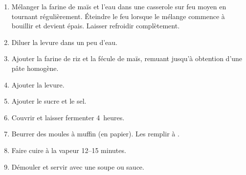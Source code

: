 
\begin{ingredientss}
\end{ingredientss}


\begin{recipe}
  \begin{enumerate}

  \item Mélanger la farine de maïs et l'eau dans une casserole sur feu
    moyen en tournant régulièrement.  Éteindre le feu lorsque le
    mélange commence à bouillir et devient épais.  Laisser refroidir
    complètement.
    
  \item Diluer la levure dans un peu d'eau.

  \item Ajouter la farine de riz et la fécule de maïs, remuant jusqu'à
    obtention d'une pâte homogène.
    
  \item Ajouter la levure.
    
  \item Ajouter le sucre et le sel.
    
  \item Couvrir et laisser fermenter 4~heures.
    
  \item Beurrer des moules à muffin (en papier).  Les remplir à
    \fracQQ.
    
  \item Faire cuire à la vapeur 12--15 minutes.
    
  \item Démouler et servir avec une soupe ou sauce.

  \end{enumerate}
\end{recipe}

